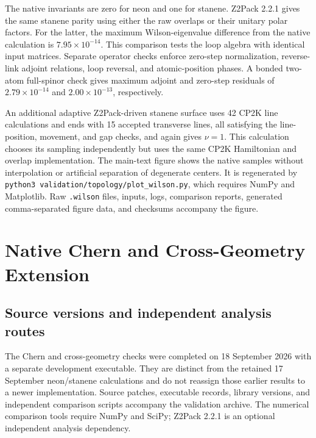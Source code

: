 \documentclass[11pt]{article}
\begin{document}
The native invariants are zero for neon and one for stanene. Z2Pack 2.2.1
gives the same stanene parity using either the raw overlaps or their
unitary polar factors. For the latter, the maximum Wilson-eigenvalue
difference from the native calculation is $7.95\times10^{-14}$. This
comparison tests the loop algebra with identical input matrices. Separate
operator checks enforce zero-step normalization, reverse-link adjoint
relations, loop reversal, and atomic-position phases. A bonded two-atom
full-spinor check gives maximum adjoint and zero-step residuals of
$2.79\times10^{-14}$ and $2.00\times10^{-13}$, respectively.

An additional adaptive Z2Pack-driven stanene surface uses 42 CP2K line
calculations and ends with 15 accepted transverse lines, all satisfying
the line-position, movement, and gap checks, and again gives $\nu=1$.
This calculation chooses its sampling independently but uses the same
CP2K Hamiltonian and overlap implementation. The main-text figure shows
the native samples without interpolation or artificial separation of
degenerate centers. It is regenerated by
\texttt{python3 validation/topology/plot\_wilson.py}, which requires NumPy
and Matplotlib. Raw \texttt{.wilson} files, inputs, logs, comparison
reports, generated comma-separated figure data, and checksums accompany
the figure.

\section{Native Chern and Cross-Geometry Extension}
\label{sec:si-chern}

\subsection{Source versions and independent analysis routes}
The Chern and cross-geometry checks were completed on 18 September
2026 with a separate development executable. They are distinct from the
retained 17 September neon/stanene calculations and do not reassign
those earlier results to a newer implementation.
Source patches, executable records, library versions, and independent
comparison scripts accompany the validation archive.
The numerical comparison tools require NumPy and SciPy; Z2Pack 2.2.1
is an optional independent analysis dependency.
\end{document}
